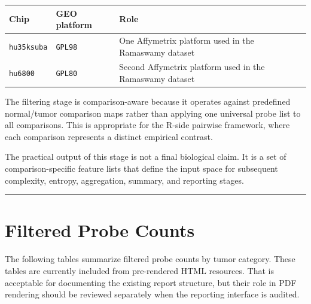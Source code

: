 \documentclass[
  letterpaper,
  DIV=11,
  numbers=noendperiod,
  openany,
  oneside]{scrreprt}
\begin{document}
\begin{longtable}[]{@{}
  >{\raggedright\arraybackslash}p{}
  >{\raggedright\arraybackslash}p{}
  >{\raggedright\arraybackslash}p{}@{}}
\toprule\noalign{}
\begin{minipage}[b]{\linewidth}\raggedright
Chip
\end{minipage} & \begin{minipage}[b]{\linewidth}\raggedright
GEO platform
\end{minipage} & \begin{minipage}[b]{\linewidth}\raggedright
Role
\end{minipage} \\
\midrule\noalign{}
\endhead
\bottomrule\noalign{}
\endlastfoot
\texttt{hu35ksuba} & \texttt{GPL98} & One Affymetrix platform used in
the Ramaswamy dataset \\
\texttt{hu6800} & \texttt{GPL80} & Second Affymetrix platform used in
the Ramaswamy dataset \\
\end{longtable}

The filtering stage is comparison-aware because it operates against
predefined normal/tumor comparison maps rather than applying one
universal probe list to all comparisons. This is appropriate for the
R-side pairwise framework, where each comparison represents a distinct
empirical contrast.

The practical output of this stage is not a final biological claim. It
is a set of comparison-specific feature lists that define the input
space for subsequent complexity, entropy, aggregation, summary, and
reporting stages.

\begin{center}\rule{0.5\linewidth}{0.5pt}\end{center}

\section{Filtered Probe Counts}\label{filtered-probe-counts}

The following tables summarize filtered probe counts by tumor category.
These tables are currently included from pre-rendered HTML resources.
That is acceptable for documenting the existing report structure, but
their role in PDF rendering should be reviewed separately when the
reporting interface is audited.
\end{document}
